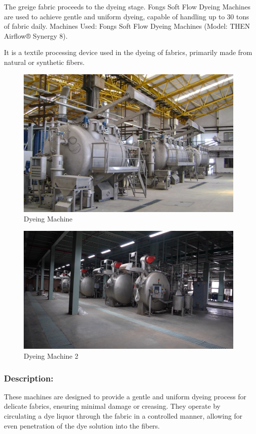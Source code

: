 The greige fabric proceeds to the dyeing stage. 
Fongs Soft Flow Dyeing Machines are used to achieve gentle and uniform dyeing, 
capable of handling up to 30 tons of fabric daily.
Machines Used: Fongs Soft Flow Dyeing Machines (Model: THEN Airflow® Synergy 8).

It is a textile processing device used in the
dyeing of fabrics, primarily made from natural or synthetic fibers.

\begin{figure}[h!]
  \centering
  \includegraphics[width=0.8\linewidth]{figs/production/image1.png}
  \caption{Dyeing Machine}
  \label{fig:Dyeing Machine}
\end{figure}

\begin{figure}[h!]
  \centering
  \includegraphics[width=0.8\linewidth]{figs/dyeing.jpg}
  \caption{Dyeing Machine 2}
  \label{fig:Dyeing Machine 2}
\end{figure}

\subsubsection{Description:}


These machines are designed to provide a gentle and uniform
dyeing process for delicate fabrics, ensuring minimal damage or
creasing. They operate by circulating a dye liquor through the fabric in
a controlled manner, allowing for even penetration of the dye solution
into the fibers.


